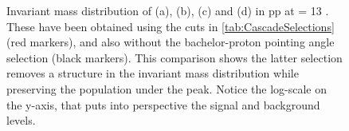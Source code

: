 \begin{figure}[t]
\hspace*{-1.5cm}
\hspace*{-1.5cm}	
	\caption{Invariant mass distribution of \rmXiM (a), \rmAxiP (b), \rmOmegaM (c) and \rmAomegaP (d) in pp at \sqrtS = 13 \tev. These have been obtained using the cuts in \tab\ref{tab:CascadeSelections} (red markers), and also without the bachelor-proton pointing angle selection (black markers). This comparison shows the latter selection removes a structure in the invariant mass distribution while preserving the population under the peak. Notice the log-scale on the y-axis, that puts into perspective the signal and background levels.}
	\label{fig:WrongPA}
\end{figure}

